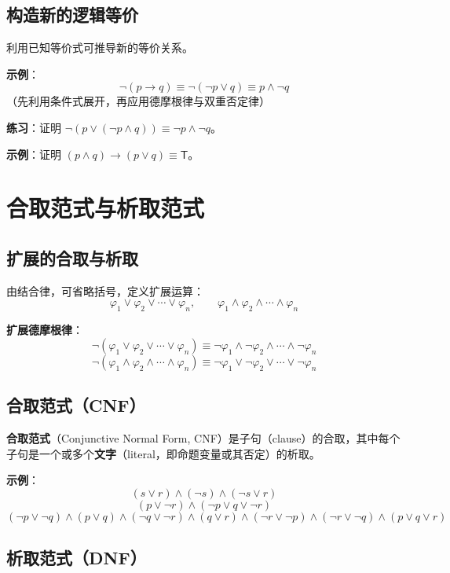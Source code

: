\documentclass[UTF8,11pt,a4paper]{ctexbook}   %
\theoremstyle{definition}
\begin{document}
\subsection{构造新的逻辑等价}

利用已知等价式可推导新的等价关系。

\textbf{示例}：
\[
\neg(p \to q) \equiv \neg(\neg p \lor q) \equiv p \land \neg q
\]
（先利用条件式展开，再应用德摩根律与双重否定律）

\textbf{练习}：证明 $\neg(p \lor (\neg p \land q)) \equiv \neg p \land \neg q$。

\textbf{示例}：证明 $(p \land q) \to (p \lor q) \equiv \mathsf{T}$。

\section{合取范式与析取范式}

\subsection{扩展的合取与析取}

由结合律，可省略括号，定义扩展运算：
\[
\varphi_1 \lor \varphi_2 \lor \cdots \lor \varphi_n, \qquad \varphi_1 \land \varphi_2 \land \cdots \land \varphi_n
\]

\textbf{扩展德摩根律}：
\[
\neg(\varphi_1 \lor \varphi_2 \lor \cdots \lor \varphi_n) \equiv \neg\varphi_1 \land \neg\varphi_2 \land \cdots \land \neg\varphi_n
\]
\[
\neg(\varphi_1 \land \varphi_2 \land \cdots \land \varphi_n) \equiv \neg\varphi_1 \lor \neg\varphi_2 \lor \cdots \lor \neg\varphi_n
\]

\subsection{合取范式（CNF）}

\textbf{合取范式}（Conjunctive Normal Form, CNF）是子句（clause）的合取，其中每个子句是一个或多个\textbf{文字}（literal，即命题变量或其否定）的析取。

\textbf{示例}：
\[
(s \lor r) \land (\neg s) \land (\neg s \lor r)
\]
\[
(p \lor \neg r) \land (\neg p \lor q \lor \neg r)
\]
\[
(\neg p \lor \neg q) \land (p \lor q) \land (\neg q \lor \neg r) \land (q \lor r) \land (\neg r \lor \neg p) \land (\neg r \lor \neg q) \land (p \lor q \lor r)
\]

\subsection{析取范式（DNF）}
\end{document}
